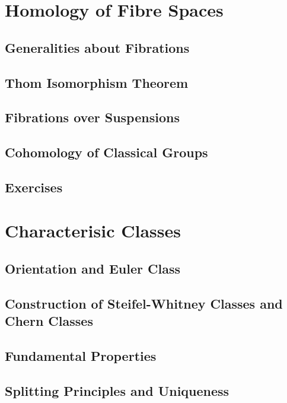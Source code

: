 \section{Homology of Fibre Spaces}

\subsection{Generalities about Fibrations}

\subsection{Thom Isomorphism Theorem}

\subsection{Fibrations over Suspensions}

\subsection{Cohomology of Classical Groups}

\subsection{Exercises}

\section{Characterisic Classes}

\subsection{Orientation and Euler Class}

\subsection{Construction of Steifel-Whitney Classes and Chern Classes}

\subsection{Fundamental Properties}

\subsection{Splitting Principles and Uniqueness}

